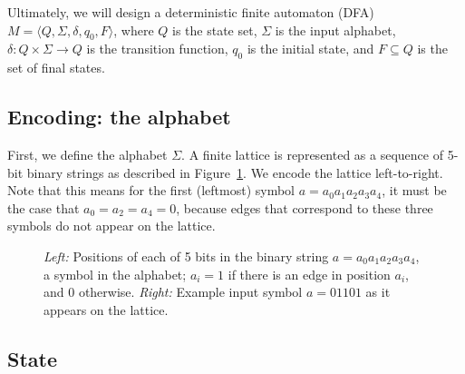Ultimately, we will design a deterministic finite automaton (DFA) $M = \langle Q, \Sigma, \delta, q_0, F \rangle$, where $Q$ is the state set, $\Sigma$ is the input alphabet, $\delta : Q\times\Sigma \rightarrow Q$ is the transition function, $q_0$ is the initial state, and $F\subseteq Q$ is the set of final states.

\subsection{Encoding: the alphabet}
\label{sec:overview-alphabet}

First, we define the alphabet $\Sigma$. A finite lattice is represented as a sequence of 5-bit binary strings as described in Figure~\ref{fig:encoding-symbol}. We encode the lattice left-to-right. Note that this means for the first (leftmost) symbol $a=a_0a_1a_2a_3a_4$, it must be the case that $a_0 = a_2 = a_4 = 0$, because edges that correspond to these three symbols do not appear on the lattice.

\begin{figure}
\begin{center}
\end{center}
\caption{\emph{Left:} Positions of each of 5 bits in the binary string $a = a_0a_1a_2a_3a_4$, a symbol in the alphabet; $a_i = 1$ if there is an edge in position $a_i$, and 0 otherwise. \emph{Right:} Example input symbol $a=01101$ as it appears on the lattice.}
\label{fig:encoding-symbol}
\end{figure}

\subsection{State}
\label{sec:overview-state}

